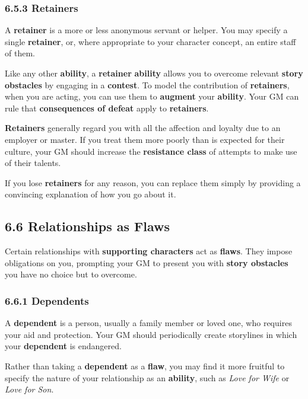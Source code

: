 \documentclass[
]{article}
\begin{document}
\hypertarget{retainers}{%
\subsubsection{6.5.3 Retainers}\label{retainers}}

A \textbf{retainer} is a more or less anonymous servant or helper. You
may specify a single \textbf{retainer}, or, where appropriate to your
character concept, an entire staff of them.

Like any other \textbf{ability}, a \textbf{retainer} \textbf{ability}
allows you to overcome relevant \textbf{story obstacles} by engaging in
a \textbf{contest}. To model the contribution of \textbf{retainers},
when you are acting, you can use them to \textbf{augment} your
\textbf{ability}. Your GM can rule that \textbf{consequences of defeat}
apply to \textbf{retainers}.

\textbf{Retainers} generally regard you with all the affection and
loyalty due to an employer or master. If you treat them more poorly than
is expected for their culture, your GM should increase the
\textbf{resistance class} of attempts to make use of their talents.

If you lose \textbf{retainers} for any reason, you can replace them
simply by providing a convincing explanation of how you go about it.

\hypertarget{relationships-as-flaws}{%
\subsection{6.6 Relationships as Flaws}\label{relationships-as-flaws}}

Certain relationships with \textbf{supporting characters} act as
\textbf{flaws}. They impose obligations on you, prompting your GM to
present you with \textbf{story obstacles} you have no choice but to
overcome.

\hypertarget{dependents}{%
\subsubsection{6.6.1 Dependents}\label{dependents}}

A \textbf{dependent} is a person, usually a family member or loved one,
who requires your aid and protection. Your GM should periodically create
storylines in which your \textbf{dependent} is endangered.

Rather than taking a \textbf{dependent} as a \textbf{flaw}, you may find
it more fruitful to specify the nature of your relationship as an
\textbf{ability}, such as \emph{Love for Wife} or \emph{Love for Son}.
\end{document}
